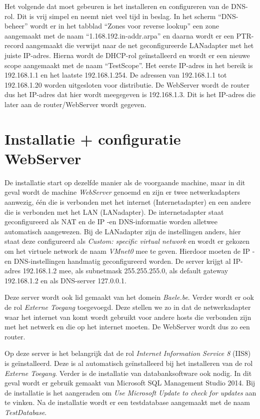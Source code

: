 \documentclass[pdftex,a4paper,12pt]{report}
\begin{document}
Het volgende dat moet gebeuren is het installeren en configureren van de DNS-rol. Dit is vrij simpel en neemt niet veel tijd in beslag. In het scherm "`DNS-beheer"' wordt er in het tabblad "`Zones voor reverse lookup"' een zone aangemaakt met de naam "`1.168.192.in-addr.arpa"' en daarna wordt er een PTR-record aangemaakt die verwijst naar de net geconfigureerde LANadapter met het juiste IP-adres. Hierna wordt de DHCP-rol geïnstalleerd en wordt er een nieuwe scope aangemaakt met de naam "`TestScope"'. Het eerste IP-adres in het bereik is 192.168.1.1 en het laatste 192.168.1.254. De adressen van 192.168.1.1 tot 192.168.1.20 worden uitgesloten voor distributie. De WebServer wordt de router dus het IP-adres dat hier wordt meegegeven is 192.168.1.3. Dit is het IP-adres die later aan de router/WebServer wordt gegeven. \newline

\section{Installatie + configuratie WebServer}
De installatie start op dezelfde manier als de voorgaande machine, maar in dit geval wordt de machine \textit{WebServer} genoemd en zijn er twee netwerkadapters aanwezig, één die is verbonden met het internet (Internetadapter) en een andere die is verbonden met het LAN (LANadapter). De internetadapter staat geconfigureerd als NAT en de IP -en DNS-informatie worden alletwee automatisch aangewezen. Bij de LANadapter zijn de instellingen anders, hier staat deze configureerd als \textit{Custom: specific virtual network} en wordt er gekozen om het virtuele network de naam \textit{VMnet0} mee te geven. Hierdoor moeten de IP -en DNS-instellingen handmatig geconfigureerd worden. De server krijgt al IP-adres 192.168.1.2 mee, als subnetmask 255.255.255.0, als default gateway 192.168.1.2 en als DNS-server 127.0.0.1. \newline 

Deze server wordt ook lid gemaakt van het domein \textit{Baele.be}. Verder wordt er ook de rol \textit{Externe Toegang} toegevoegd. Deze stellen we zo in dat de netwerkadapter waar het internet van komt wordt gebruikt voor andere hosts die verbonden zijn met het netwerk en die op het internet moeten. De WebServer wordt dus zo een router. \newline

Op deze server is het belangrijk dat de rol \textit{Internet Information Service 8} (IIS8) is geïnstalleerd. Deze is al automatisch geïnstalleerd bij het installeren van de rol \textit{Externe Toegang}. Verder is de installatie van databanksoftware ook nodig. In dit geval wordt er gebruik gemaakt van Microsoft SQL Management Studio 2014. Bij de installatie is het aangeraden om \textit{Use Microsoft Update to check for updates} aan te vinken. Na de installatie wordt er een testdatabase aangemaakt met de naam \textit{TestDatabase}. \newline
\end{document}

